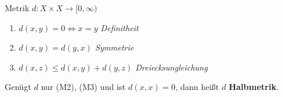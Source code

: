 

\begin{definition}{Metrik}
  $d:X \times X \to [0,\infty)$
  \begin{enumerate}[label=(M\arabic*)]
    \item $d(x,y) = 0 \Leftrightarrow x = y$ \textit{Definitheit}
    \item $d(x,y) = d(y,x)$ \textit{Symmetrie}
    \item $d(x,z) \leq d(x,y) + d(y,z)$ \textit{Dreiecksungleichung}
  \end{enumerate}
\end{definition}

Genügt $d$ nur (M2), (M3) und ist $d(x,x) = 0$, dann heißt $d$
\textbf{Halbmetrik}.\\
